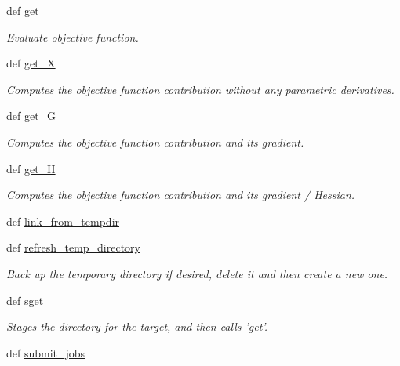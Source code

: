 \begin{DoxyCompactItemize}
\item 
def \hyperlink{classforcebalance_1_1interaction_1_1Interaction_a9fc3a40eb2852241ea440af719f6cf29}{get}
\begin{DoxyCompactList}\small\item\em \-Evaluate objective function. \end{DoxyCompactList}\item 
def \hyperlink{classforcebalance_1_1target_1_1Target_a606dd136f195c267c05a2455405e5949}{get\-\_\-\-X}
\begin{DoxyCompactList}\small\item\em \-Computes the objective function contribution without any parametric derivatives. \end{DoxyCompactList}\item 
def \hyperlink{classforcebalance_1_1target_1_1Target_afa8cc38c8bba8861c072e789717aa049}{get\-\_\-\-G}
\begin{DoxyCompactList}\small\item\em \-Computes the objective function contribution and its gradient. \end{DoxyCompactList}\item 
def \hyperlink{classforcebalance_1_1target_1_1Target_a1d2ee27fe86a09769c1816af23b09adb}{get\-\_\-\-H}
\begin{DoxyCompactList}\small\item\em \-Computes the objective function contribution and its gradient / \-Hessian. \end{DoxyCompactList}\item 
def \hyperlink{classforcebalance_1_1target_1_1Target_a5aa4958cea0a48138511567a076c5a82}{link\-\_\-from\-\_\-tempdir}
\item 
def \hyperlink{classforcebalance_1_1target_1_1Target_afe815eafab06ac92f10bbf4b88ad95c8}{refresh\-\_\-temp\-\_\-directory}
\begin{DoxyCompactList}\small\item\em \-Back up the temporary directory if desired, delete it and then create a new one. \end{DoxyCompactList}\item 
def \hyperlink{classforcebalance_1_1target_1_1Target_a51d58b55242bf4d4909c1837174f5f3c}{sget}
\begin{DoxyCompactList}\small\item\em \-Stages the directory for the target, and then calls 'get'. \end{DoxyCompactList}\item 
def \hyperlink{classforcebalance_1_1target_1_1Target_a78cd29b94cbcc201eed99c78aaef46a4}{submit\-\_\-jobs}

\end{DoxyCompactItemize}
